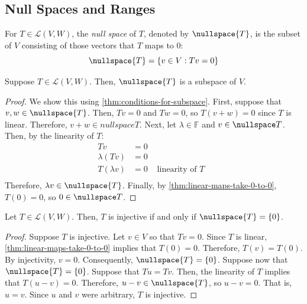 \documentclass{article}
\begin{document}
\subsection{Null Spaces and Ranges}

\begin{definition}
  \label{def:null-space}
  For $T \in \mathcal{L}(V, W)$, the \textit{null space} of $T$,
  denoted by $\nullspace{T}$, is the subset of $V$ consisting of those
  vectors that $T$ maps to $0$:
  $$\nullspace{T} = \{v \in V: Tv = 0\}$$
\end{definition}

\begin{theorem}
  \label{thm:null-space-is-a-subspace}
  Suppose $T \in \mathcal{L}(V, W)$. Then, $\nullspace{T}$ is a
  subspace of $V$.
\end{theorem}
\begin{proof}
  We show this using \cref{thm:conditions-for-subspace}. First,
  suppose that $v, w \in \nullspace{T}$. Then, $Tv = 0$ and $Tw = 0$,
  so $T(v + w) = 0$ since $T$ is linear. Therefore, $v + w \in
  nullspace{T}$. Next, let $\lambda \in \mathbb{F}$ and $v \in
  \nullspace T$. Then, by the linearity of $T$:
  \begin{align*}
    Tv &= 0 \\
    \lambda(Tv) &= 0 \\
    T(\lambda v) &= 0 & \text{ linearity of $T$ } \\ 
  \end{align*}
  Therefore, $\lambda v \in \nullspace{T}$. Finally, by
  \cref{thm:linear-maps-take-0-to-0}, $T(0) = 0$, so $0 \in \nullspace
  T$.
\end{proof}

\begin{theorem}
  \label{thm:injectivity-iff-null-space-equals-0-subspace}
  Let $T \in \mathcal{L}(V, W)$. Then, $T$ is injective if and only if
  $\nullspace{T} = \{0\}$.
\end{theorem}
\begin{proof}
  Suppose $T$ is injective. Let $v \in V$ so that $Tv = 0$. Since $T$
  is linear, \cref{thm:linear-maps-take-0-to-0} implies that $T(0) =
  0$. Therefore, $T(v) = T(0)$. By injectivity, $v = 0$. Consequently,
  $\nullspace{T} = \{0\}$. Suppose now that $\nullspace{T} =
  \{0\}$. Suppose that $Tu = Tv$. Then, the linearity of $T$ implies
  that $T(u - v) = 0$. Therefore, $u - v \in \nullspace{T}$, so $u - v
  = 0$. That is, $u = v$. Since $u$ and $v$ were arbitrary, $T$ is injective.
\end{proof}
\end{document}
